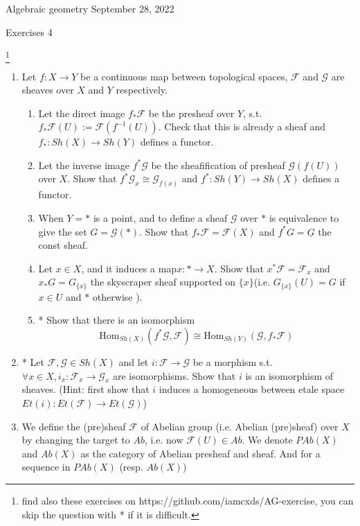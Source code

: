 \documentclass[a4paper,11pt]{article}
\def\Hom{\mathrm{Hom}}
\begin{document}
{\small Algebraic geometry \hfill September 28, 2022 \\}
\begin{center}
\Huge Exercises 4
\end{center}

\vskip0.6cm
\footnote{find also these exercises on https://github.com/iamcxds/AG-exercise, you can skip the question with * if it is difficult.}

\begin{enumerate}[1.]
\item Let $f: X\to Y$ be a continuous map between topological spaces, $\mathcal{F}$ and $\mathcal{G}$ are sheaves over $X$ and $Y$ respectively.
\begin{enumerate}
    \item Let the direct image $f_* \mathcal{F}$ be the presheaf over $Y$, s.t. $f_* \mathcal{F}(U):=\mathcal{F}(f^{-1}(U))$. Check that this is already a sheaf and $f_*: Sh(X)\to Sh(Y)$ defines a functor.
    \item Let the inverse image $f^*\mathcal{G}$ be the sheafification of presheaf $\mathcal{G}(f(U))$ over $X$. Show that $f^*\mathcal{G}_x\cong \mathcal{G}_{f(x)} $ and $f^*: Sh(Y)\to Sh(X)$ defines a functor.
    \item When $Y=*$ is a point, and to define a sheaf $\mathcal{G}$ over $*$ is equivalence to give the set $G=\mathcal{G}(*)$. Show that $f_* \mathcal{F}=\mathcal{F}(X)$ and $f^*G=\underline{G} $ the const sheaf.
    \item Let $x\in X$, and it induces a map$x: *\to X$. Show that $x^* \mathcal{F}=\mathcal{F}_x$ and $x_*G= G_{\{x\}} $ the skyscraper sheaf supported on $\{x\}$(i.e. $G_{\{x\}}(U)=G$ if $x\in U$ and $*$ otherwise ).
    \item* Show that there is an isomorphism 
    \[ \Hom_{Sh(X)}(f^*\mathcal{G},\mathcal{F})\cong \Hom_{Sh(Y)}(\mathcal{G},f_*\mathcal{F})\]
\end{enumerate}
\item* Let $\mathcal{F},\mathcal{G}\in Sh(X)$ and let $i:\mathcal{F}\to\mathcal{G} $ be a morphism s.t. $ \forall x\in X, i_x:\mathcal{F}_x\to\mathcal{G}_x$ are isomorphisms. Show that $i$ is an isomorphism of sheaves. (Hint: first show that $i$ induces a homogeneous between etale space $Et(i):Et(\mathcal{F})\to Et(\mathcal{G})$)
\item We define the (pre)sheaf $\mathcal{F}$ of Abelian group (i.e. Abelian (pre)sheaf) over $X$ by changing the target to $Ab$, i.e. now $\mathcal{F}(U)\in Ab$. We denote $PAb(X)$ and $Ab(X)$ as the category of Abelian presheaf and sheaf. And for a sequence in $PAb(X)$ (resp. $Ab(X)$) 

\end{enumerate}
\end{document}

